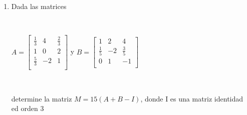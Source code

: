 \documentclass[11pt, conference]{IEEEtran}
\begin{document}
{\begin{enumerate}
    {\bf \underline{Solucion:}}
    \[
    	A+B = \left[
        \begin{array}{cccc}
        2-4 & 1+3 & 0+2 & 3+0 \\
        -1+1 & 0-2 & 2+4 & 3+5 \\
        1+2 & 4-2 & 2+1 & 7+0\\
        \end{array}
        \right]
    \]
    \[
    	A+B = \left[
        \begin{array}{cccc}
        -2 & 4 & 2 & 3 \\
        0 & -2 & 6 & 8 \\
        3 & 2 & 3 & 7\\
        \end{array}
        \right]
    \]
    \[
    	A-B = \left[
        \begin{array}{cccc}
        2+4 & 1-3 & 0-2 & 3-0 \\
        -1-1 & 0+2 & 2-4 & 3-5 \\
        1-2 & 4+2 & 2-1 & 7-0\\
        \end{array}
        \right]
    \]
    \[
    	A-B= \left[
        \begin{array}{cccc}
        6 & -2 & -2 & 3 \\
        0 & 2 & -2 & -2 \\
        -1 & 6 & 1 & 7\\
        \end{array}
        \right]
    \]
    \item Dada las matrices
    
    \
    
    $
      A = \left[
      \begin{array}{ccc}
      \frac{1}{3} & 4 & \frac{2}{3} \\
      1 & 0 & 2 \\
      \frac{5}{3} & -2 & 1 \\
      \end{array}
      \right]
    $ y $
      B = \left[
      \begin{array}{ccc}
      1 & 2 & 4 \\
      \frac{1}{5} & -2 & \frac{3}{5} \\
      0 & 1 & -1 \\
      \end{array}
      \right]
    $
    
    \
    
    determine la matriz $M = 15(A+B-I)$, donde I es una matriz identidad ed orden 3
    

\end{enumerate}}
\end{document}
